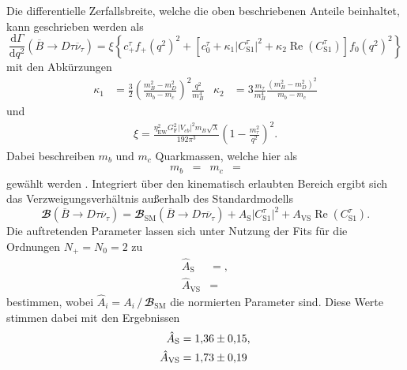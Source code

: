 Die differentielle Zerfallsbreite, welche die oben beschriebenen Anteile beinhaltet, kann geschrieben werden als \cite{PhysRevD.88.094012}
\begin{equation}
  \label{eqn:wq_bsm}
  \frac{\mathrm{d} \Gamma}{\mathrm{d} q^2} \left(\overline{B} \to D \tau \overline{\nu}_{\tau} \right) = \xi \left\lbrace c_+^{\tau} f_+(q^2)^2 + \left\lbrack c_0^{\tau} + \kappa_1 \lvert C_{\text{S}1}^{\tau} \rvert^2 + \kappa_2 \operatorname{Re}(C_{\text{S}1}^{\tau}) \right\rbrack f_0(q^2)^2 \right\rbrace
\end{equation}
mit den Abkürzungen
\begin{align*}
  \kappa_1 &= \frac{3}{2} \left( \frac{m_B^2 - m_D^2}{m_b - m_c} \right)^2 \frac{q^2}{m_B^4} & \kappa_2 &= 3  \frac{m_\tau}{m_B^4} \frac{(m_B^2 - m_D^2)^2}{m_b - m_c}
\end{align*}
und
\begin{align*}
  \xi = \frac{\eta_\text{EW}^2 G_\text{F}^2 \lvert V_{cb} \rvert^2 m_B \sqrt{\lambda} }{192 \pi^3} \left( 1 - \frac{m_\tau^2}{q^2} \right)^2.
\end{align*}
Dabei beschreiben $m_b$ und $m_c$ Quarkmassen, welche hier als
\begin{align*}
  m_b &=  & m_c &= 
\end{align*}
gewählt werden \cite{Agashe:2014kda}.
Integriert über den kinematisch erlaubten Bereich ergibt sich das Verzweigungsverhältnis außerhalb des Standardmodells
\begin{equation}
  \label{eqn:R_bsm}
  {\mathbfcal{B}}\!\left(\overline{B} \to D \tau \overline{\nu}_\tau \right) = {\mathbfcal{B}}_\text{SM}\!\left(\overline{B} \to D \tau \overline{\nu}_\tau \right) + A_\text{S} \lvert C_{\text{S}1}^{\tau} \rvert^2 + A_{\text{VS}} \operatorname{Re}(C_{\text{S}1}^{\tau}).
\end{equation}
Die auftretenden Parameter lassen sich unter Nutzung der Fits für die Ordnungen $N_+ = N_0 = \num{2}$ zu
\begin{align*}
  \hat{A}_\text{S} &= , \\
  \hat{A}_{\text{VS}} &= 
\end{align*}
bestimmen, wobei $\hat{A}_i = A_i \,/\, {\mathbfcal{B}}_\text{SM}$ die normierten Parameter sind.
Diese Werte stimmen dabei mit den Ergebnissen
\begin{align*}
  \hat{A}_\text{S} &= \num{1.36+-0.15}, \\
  \hat{A}_{\text{VS}} &= \num{1.73+-0.19}
\end{align*}
